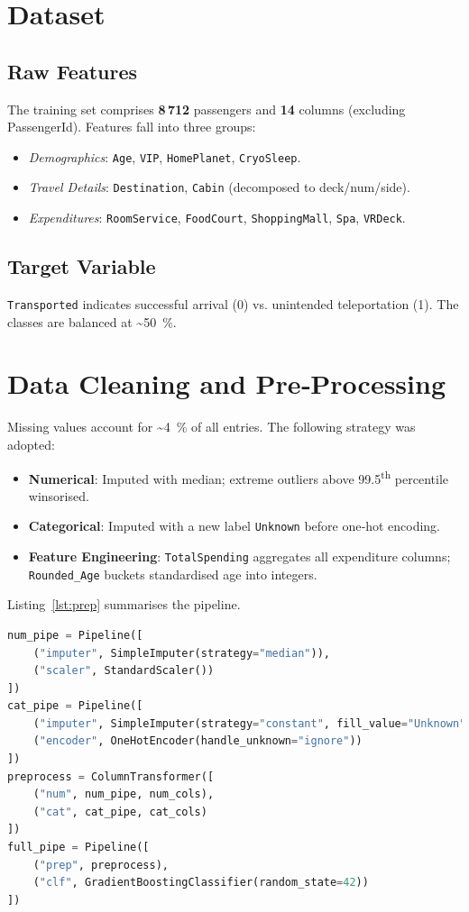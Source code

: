 \documentclass[12pt]{article}
\begin{document}
\section{Dataset}
\subsection{Raw Features}
The training set comprises \textbf{8\,712} passengers and \textbf{14} columns (excluding PassengerId).  Features fall into three groups:
\begin{itemize}
  \item \emph{Demographics}: \texttt{Age}, \texttt{VIP}, \texttt{HomePlanet}, \texttt{CryoSleep}.
  \item \emph{Travel Details}: \texttt{Destination}, \texttt{Cabin} (decomposed to deck/num/side).
  \item \emph{Expenditures}: \texttt{RoomService}, \texttt{FoodCourt}, \texttt{ShoppingMall}, \texttt{Spa}, \texttt{VRDeck}.
\end{itemize}
\subsection{Target Variable}
\texttt{Transported} indicates successful arrival (0) vs. unintended teleportation (1).  The classes are balanced at \textasciitilde50 \%.

\section{Data Cleaning and Pre‑Processing}
Missing values account for \textasciitilde4 \% of all entries.  The following strategy was adopted:
\begin{itemize}
  \item \textbf{Numerical}: Imputed with median; extreme outliers above 99.5\textsuperscript{th} percentile winsorised.
  \item \textbf{Categorical}: Imputed with a new label \texttt{Unknown} before one‑hot encoding.
  \item \textbf{Feature Engineering}: \texttt{TotalSpending} aggregates all expenditure columns; \texttt{Rounded\_Age} buckets standardised age into integers.
\end{itemize}
Listing \ref{lst:prep} summarises the pipeline.
\begin{lstlisting}[language=Python,caption={Key preprocessing steps in scikit‑learn},label={lst:prep},basicstyle=\ttfamily\small]
num_pipe = Pipeline([
    ("imputer", SimpleImputer(strategy="median")),
    ("scaler", StandardScaler())
])
cat_pipe = Pipeline([
    ("imputer", SimpleImputer(strategy="constant", fill_value="Unknown")),
    ("encoder", OneHotEncoder(handle_unknown="ignore"))
])
preprocess = ColumnTransformer([
    ("num", num_pipe, num_cols),
    ("cat", cat_pipe, cat_cols)
])
full_pipe = Pipeline([
    ("prep", preprocess),
    ("clf", GradientBoostingClassifier(random_state=42))
])
\end{lstlisting}
\end{document}
